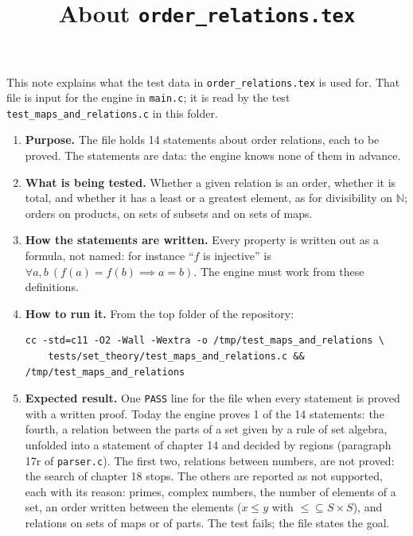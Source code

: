 \documentclass[11pt,a4paper]{article}
\title{About \texttt{order\_relations.tex}}
\author{}
\date{}
\begin{document}
\maketitle
This note explains what the test data in \texttt{order\_relations.tex} is used for. That file is input for the engine in \texttt{main.c}; it is read by the test \texttt{test\_maps\_and\_relations.c} in this folder.

\begin{enumerate}
\item \textbf{Purpose.} The file holds 14 statements about order relations, each to be proved. The statements are data: the engine knows none of them in advance.

\item \textbf{What is being tested.} Whether a given relation is an order, whether it is total, and whether it has a least or a greatest element, as for divisibility on $\mathbb{N}$; orders on products, on sets of subsets and on sets of maps.

\item \textbf{How the statements are written.} Every property is written out as a formula, not named: for instance ``$f$ is injective'' is $\forall a, b\ (f(a) = f(b) \implies a = b)$. The engine must work from these definitions.

\item \textbf{How to run it.} From the top folder of the repository:
\begin{verbatim}
cc -std=c11 -O2 -Wall -Wextra -o /tmp/test_maps_and_relations \
    tests/set_theory/test_maps_and_relations.c && /tmp/test_maps_and_relations
\end{verbatim}

\item \textbf{Expected result.} One \texttt{PASS} line for the file when every statement is proved with a written proof. Today the engine proves 1 of the 14 statements: the fourth, a relation between the parts of a set given by a rule of set algebra, unfolded into a statement of chapter 14 and decided by regions (paragraph 17r of \texttt{parser.c}). The first two, relations between numbers, are not proved: the search of chapter 18 stops. The others are reported as not supported, each with its reason: primes, complex numbers, the number of elements of a set, an order written between the elements ($x \le y$ with ${\le} \subseteq S \times S$), and relations on sets of maps or of parts. The test fails; the file states the goal.
\end{enumerate}
\end{document}
